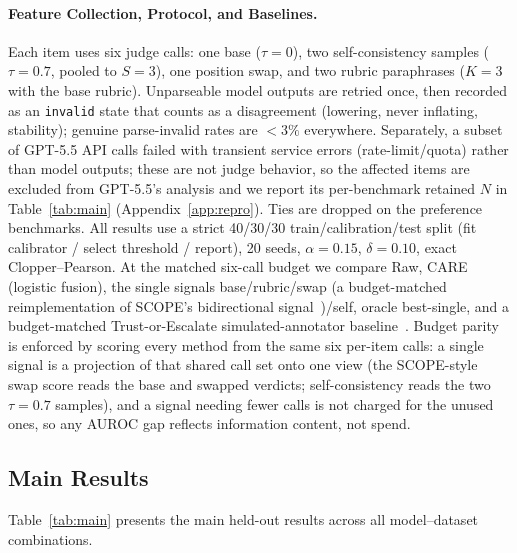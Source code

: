 \paragraph{Feature Collection, Protocol, and Baselines.}
Each item uses six judge calls: one base ($\tau{=}0$), two self-consistency samples ($\tau{=}0.7$, pooled to $S{=}3$), one position swap, and two rubric paraphrases ($K{=}3$ with the base rubric). Unparseable model outputs are retried once, then recorded as an \texttt{invalid} state that counts as a disagreement (lowering, never inflating, stability); genuine parse-invalid rates are $<3\%$ everywhere. Separately, a subset of GPT-5.5 API calls failed with transient service errors (rate-limit/quota) rather than model outputs; these are not judge behavior, so the affected items are excluded from GPT-5.5's analysis and we report its per-benchmark retained $N$ in Table~\ref{tab:main} (Appendix~\ref{app:repro}). Ties are dropped on the preference benchmarks. All results use a strict 40/30/30 train/calibration/test split (fit calibrator / select threshold / report), 20 seeds, $\alpha{=}0.15$, $\delta{=}0.10$, exact Clopper--Pearson. At the matched six-call budget we compare Raw, CARE (logistic fusion), the single signals base/rubric/swap (a budget-matched reimplementation of SCOPE's bidirectional signal~\citep{badshah2026scope})/self, oracle best-single, and a budget-matched Trust-or-Escalate simulated-annotator baseline~\citep{jung2025trust}. Budget parity is enforced by scoring every method from the same six per-item calls: a single signal is a projection of that shared call set onto one view (the SCOPE-style swap score reads the base and swapped verdicts; self-consistency reads the two $\tau{=}0.7$ samples), and a signal needing fewer calls is not charged for the unused ones, so any AUROC gap reflects information content, not spend.

\subsection{Main Results}
\label{sec:exp:main}

Table~\ref{tab:main} presents the main held-out results across all model--dataset combinations.

